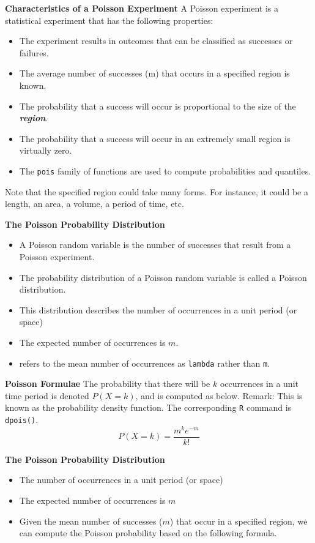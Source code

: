 \documentclass[a4paper,12pt]{article}
\begin{document}
{
\textbf{Characteristics of a Poisson Experiment}
A Poisson experiment is a statistical experiment that has the following properties:
\begin{itemize}
\item The experiment results in outcomes that can be classified as successes or failures.
\item The average number of successes (m) that occurs in a specified region is known.
\item The probability that a success will occur is proportional to the size of the \textbf{\emph{region}}.
\item The probability that a success will occur in an extremely small region is virtually zero.
\item The \texttt{pois} family of functions are used to compute probabilities and quantiles.
\end{itemize}
Note that the specified region could take many forms. For instance, it could be a length, an area, a volume, a period of time, etc.
}


{
\textbf{The Poisson Probability Distribution}
\begin{itemize}
\item A Poisson random variable is the number of successes that result from a Poisson experiment.
\item The probability distribution of a Poisson random variable is called a Poisson distribution.
\item This distribution describes the number of occurrences in a unit period (or space)
\item The expected number of occurrences is $m$.
\item {} refers to the mean number of occurrences as \texttt{lambda} rather than \texttt{m}. 
\end{itemize}
}

{
\textbf{Poisson Formulae}
The probability that there will be $k$ occurrences in a unit time period is denoted $P(X=k)$, and is computed as below. Remark: This is known as the probability density function. The corresponding \texttt{R} command is \texttt{dpois()}.
\Large
\[ P(X = k)=\frac{m^k e^{-m}}{k!} \]


}
{
	\textbf{The Poisson Probability Distribution}
	\begin{itemize}
		\item The number of occurrences in a unit period (or space)
		\item The expected number of occurrences is $m$
		\item Given the mean number of successes ($m$) that occur in a specified region, we can compute the Poisson probability based on the following formula.
	\end{itemize}
}
\end{document}
